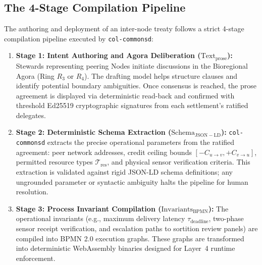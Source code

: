 \subsection{The 4-Stage Compilation Pipeline}

The authoring and deployment of an inter-node treaty follows a strict 4-stage compilation pipeline executed by \texttt{col-commonsd}:

\begin{enumerate}
  \item \textbf{Stage 1: Intent Authoring and Agora Deliberation ($\mathrm{Text}_{\mathrm{prose}}$):} 
  Stewards representing peering Nodes initiate discussions in the Bioregional Agora (Ring $R_3$ or $R_4$). The drafting model helps structure clauses and identify potential boundary ambiguities. Once consensus is reached, the prose agreement is displayed via deterministic read-back and confirmed with threshold Ed25519 cryptographic signatures from each settlement's ratified delegates.
  
  \item \textbf{Stage 2: Deterministic Schema Extraction ($\mathrm{Schema}_{\mathrm{JSON-LD}}$):}
  \texttt{col-commonsd} extracts the precise operational parameters from the ratified agreement: peer network addresses, credit ceiling bounds $[-C_{u \to v}, +C_{v \to u}]$, permitted resource types $\mathcal{T}_{\mathrm{res}}$, and physical sensor verification criteria. This extraction is validated against rigid JSON-LD schema definitions; any ungrounded parameter or syntactic ambiguity halts the pipeline for human resolution.
  
  \item \textbf{Stage 3: Process Invariant Compilation ($\mathrm{Invariants}_{\mathrm{BPMN}}$):}
  The operational invariants (e.g., maximum delivery latency $\tau_{\mathrm{deadline}}$, two-phase sensor receipt verification, and escalation paths to sortition review panels) are compiled into BPMN 2.0 execution graphs. These graphs are transformed into deterministic WebAssembly binaries designed for Layer~4 runtime enforcement.
  

\end{enumerate}
